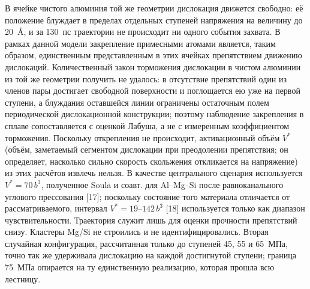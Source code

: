 В ячейке чистого алюминия той же геометрии дислокация движется свободно: её
положение блуждает в пределах отдельных ступеней напряжения на величину до
20~\AA{}, и за 130~пс траектории не происходит ни одного события захвата. В
рамках данной модели закрепление примесными атомами является, таким
образом, единственным представленным в этих ячейках препятствием движению
дислокаций. Количественный закон торможения дислокации в чистом алюминии
из той же геометрии получить не удалось: в отсутствие препятствий один из
членов пары достигает свободной поверхности и поглощается ею уже на первой
ступени, а блуждания оставшейся линии ограничены остаточным полем
периодической дислокационной конструкции; поэтому наблюдение закрепления в
сплаве сопоставляется с оценкой Лабуша, а не с измеренным коэффициентом
торможения. Поскольку открепления не происходит, активационный объём $V^{*}$ (объём, заметаемый сегментом дислокации при преодолении препятствия; он определяет, насколько сильно скорость скольжения откликается на напряжение) из этих расчётов извлечь нельзя. В качестве
центрального сценария используется $V^{*} = 70\,b^{3}$, полученное Soula и
соавт. для Al--Mg--Si после равноканального углового прессования [17];
поскольку состояние того материала отличается от рассматриваемого,
интервал $V^{*} = 19$--$142\,b^{3}$ [18] используется только как диапазон
чувствительности. Траектория служит лишь для оценки прочности препятствий
снизу. Кластеры Mg/Si не строились и не идентифицировались. Вторая случайная
конфигурация, рассчитанная только до ступеней 45, 55 и 65~МПа, точно так же
удерживала дислокацию на каждой достигнутой ступени; граница 75~МПа
опирается на ту единственную реализацию, которая прошла всю лестницу.